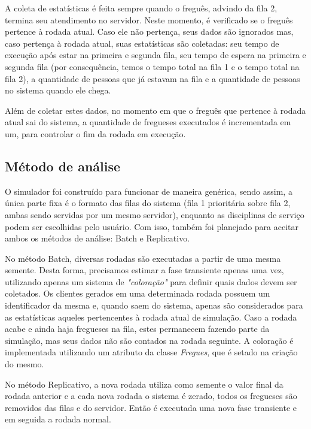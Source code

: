 \documentclass[a4paper,10pt]{article}
\begin{document}
    A coleta de estatísticas é feita sempre quando o freguês, advindo da fila 2, termina seu atendimento no servidor. Neste momento, é verificado se o freguês pertence à rodada atual. Caso ele não pertença, seus dados são ignorados mas, caso pertença à rodada atual, suas estatísticas são coletadas: seu tempo de execução após estar na primeira e segunda fila, seu tempo de espera na primeira e segunda fila (por consequência, temos o tempo total na fila 1 e o tempo total na fila 2), a quantidade de pessoas que já estavam na fila e a quantidade de pessoas no sistema quando ele chega.

    Além de coletar estes dados, no momento em que o freguês que pertence à rodada atual sai do sistema, a quantidade de fregueses executados é incrementada em um, para controlar o fim da rodada em execução.

\subsection{Método de análise}

    O simulador foi construído para funcionar de maneira genérica, sendo assim, a única parte fixa é o formato das filas do sistema (fila 1 prioritária sobre fila 2, ambas sendo servidas por um mesmo servidor), enquanto as disciplinas de serviço podem ser escolhidas pelo usuário. Com isso, também foi planejado para aceitar ambos os métodos de análise: Batch e Replicativo.

    No método Batch, diversas rodadas são executadas a partir de uma mesma semente. Desta forma, precisamos estimar a fase transiente apenas uma vez, utilizando apenas um sistema de \emph{"coloração"} para definir quais dados devem ser coletados. Os clientes gerados em uma determinada rodada possuem um identificador da mesma e, quando saem do sistema, apenas são considerados para as estatísticas aqueles pertencentes à rodada atual de simulação. Caso a rodada acabe e ainda haja fregueses na fila, estes permanecem fazendo parte da simulação, mas seus dados não são contados na rodada seguinte. A coloração é implementada utilizando um atributo da classe \emph{Fregues}, que é setado na criação do mesmo.

    No método Replicativo, a nova rodada utiliza como semente o valor final da rodada anterior e a cada nova rodada o sistema é zerado, todos os fregueses são removidos das filas e do servidor. Então é executada uma nova fase transiente e em seguida a rodada normal.
\end{document}
